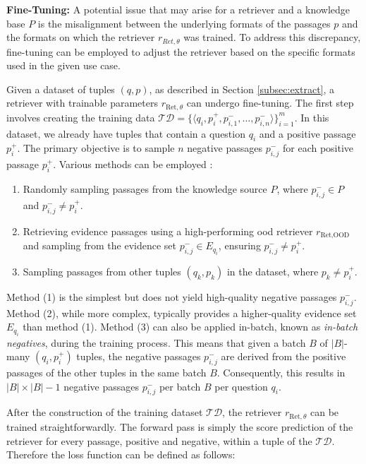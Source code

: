 \vspace{\baselineskip}

\textbf{Fine-Tuning:} A potential issue that may arise for a retriever and a knowledge base $P$ is the misalignment between the underlying formats of the passages $p$ and the formats on which the retriever $r_{Ret,\theta}$ was trained. To address this discrepancy, fine-tuning can be employed to adjust the retriever based on the specific formats used in the given use case.

Given a dataset of tuples $(q, p)$, as described in Section \ref{subsec:extract}, a retriever with trainable parameters $r_{\text{Ret}, \theta}$ can undergo fine-tuning. The first step involves creating the training data $\mathcal{TD} = \{\langle q_i, p_i^+, p_{i,1}^-, \dots, p_{i,n}^-\rangle\}_{i=1}^m$. In this dataset, we already have tuples that contain a question $q_i$ and a positive passage $p_i^+$. The primary objective is to sample $n$ negative passages $p_{i,j}^-$ for each positive passage $p_i^+$. Various methods can be employed \cite{karpukhin_dense_2020}:

\begin{enumerate}
    \item Randomly sampling passages from the knowledge source $P$, where $p_{i,j}^- \in P$ and $p_{i,j}^- \neq p_i^+$.
    \item Retrieving evidence passages using a high-performing \gls{ood} retriever $r_{\text{Ret},\text{OOD}}$ and sampling from the evidence set $p_{i,j}^- \in E_{q_i}$, ensuring $p_{i,j}^- \neq p_i^+$.
    \item Sampling passages from other tuples $(q_k,p_k)$ in the dataset, where $p_k \neq p_i^+$.
\end{enumerate}

Method (1) is the simplest but does not yield high-quality negative passages $p_{i,j}^-$. Method (2), while more complex, typically provides a higher-quality evidence set $E_{q_i}$ than method (1). Method (3) can also be applied in-batch, known as \textit{in-batch negatives}, during the training process. This means that given a batch $B$ of $|B|$-many $(q_i,p_i^+)$ tuples, the negative passages $p_{i,j}^-$ are derived from the positive passages of the other tuples in the same batch $B$. Consequently, this results in $|B| \times |B| - 1$ negative passages $p_{i,j}^-$ per batch $B$ per question $q_i$.

After the construction of the training dataset $\mathcal{TD}$, the retriever $r_{\text{Ret}, \theta}$ can be trained straightforwardly. The forward pass is simply the score prediction of the retriever for every passage, positive and negative, within a tuple of the $\mathcal{TD}$. Therefore the loss function can be defined as follows:

